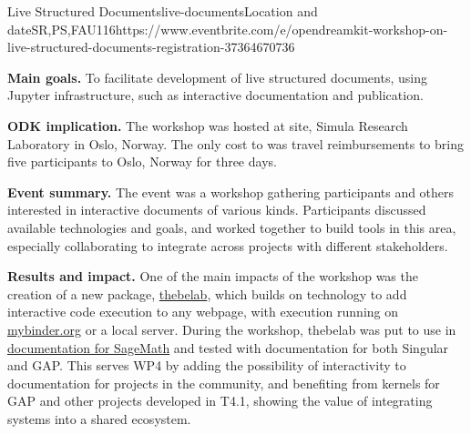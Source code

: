 \begin{event}{Live Structured Documents}{live-documents}{Location and date}{SR,PS,FAU}{11}{6}{https://www.eventbrite.com/e/opendreamkit-workshop-on-live-structured-documents-registration-37364670736}

\textbf{Main goals.} To facilitate development of live structured documents, using Jupyter infrastructure, such as interactive documentation and publication.

\textbf{ODK implication.}
The workshop was hosted at \ODK site, Simula Research Laboratory in Oslo, Norway. The only cost to \ODK was travel reimbursements to bring five participants to Oslo, Norway for three days.

\textbf{Event summary.} The event was a workshop gathering \ODK participants and others interested in interactive documents of various kinds.
Participants discussed available technologies and goals,
and worked together to build tools in this area,
especially collaborating to integrate across projects with different stakeholders.

\textbf{Results and impact.}
One of the main impacts of the workshop
was the creation of a new package, \href{https://github.com/minrk/thebelab}{thebelab},
which builds on \Jupyter technology
to add interactive code execution to any webpage,
with execution running on \href{https://mybinder.org}{mybinder.org} or a local \Jupyter server.
During the workshop, thebelab was put to use in \href{https://more-sagemath-tutorials.readthedocs.io/en/latest/}{documentation for
SageMath} and tested with documentation for both Singular and GAP.
This serves WP4 by adding the possibility of interactivity to documentation for projects in the \ODK community,
and benefiting from kernels for GAP and other \ODK projects developed in T4.1,
showing the value of integrating \ODK systems into a shared \Jupyter ecosystem.

\end{event}
